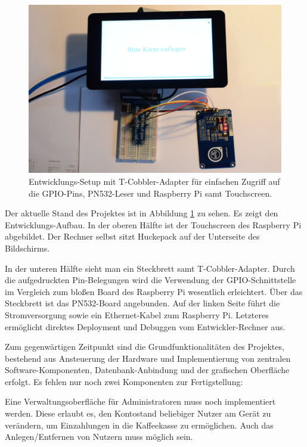 \documentclass[11pt,a4paper]{IEEEtran}
\begin{document}
\begin{figure}
    \centering
    \includegraphics[width=.9\textwidth]{images/development_setup.jpg}
    \caption{Entwicklungs-Setup mit \glqq T-Cobbler\grqq{}-Adapter für einfachen
    Zugriff auf die GPIO-Pins, PN532-Leser und Raspberry Pi samt Touchscreen.}
    \label{fig:devsetup}
\end{figure}

Der aktuelle Stand des Projektes ist in Abbildung \ref{fig:devsetup} zu sehen.
Es zeigt den Entwicklungs-Aufbau. In der oberen Hälfte ist der Touchscreen 
des Raspberry Pi abgebildet. Der Rechner selbst sitzt Huckepack auf der
Unterseite des Bildschirms.

In der unteren Hälfte sieht man ein Steckbrett samt \glqq
T-Cobbler\grqq{}-Adapter. Durch die aufgedruckten Pin-Belegungen wird die
Verwendung der GPIO-Schnittstelle im Vergleich zum bloßen Board des Raspberry
Pi wesentlich erleichtert. Über das Steckbrett ist das PN532-Board angebunden.
Auf der linken Seite führt die Stromversorgung sowie ein Ethernet-Kabel zum
Raspberry Pi. Letzteres ermöglicht direktes Deployment und Debuggen vom
Entwickler-Rechner aus.

Zum gegenwärtigen Zeitpunkt sind die Grundfunktionalitäten des Projektes,
bestehend aus Ansteuerung der Hardware und Implementierung von zentralen 
Software-Komponenten, Datenbank-Anbindung und der grafischen Oberfläche 
erfolgt. Es fehlen nur noch zwei Komponenten zur Fertigstellung:

Eine Verwaltungsoberfläche für Administratoren muss noch implementiert werden.
Diese erlaubt es, den Kontostand beliebiger Nutzer am Gerät zu verändern, um
Einzahlungen in die Kaffeekasse zu ermöglichen. Auch das Anlegen/Entfernen
von Nutzern muss möglich sein.
\end{document}
